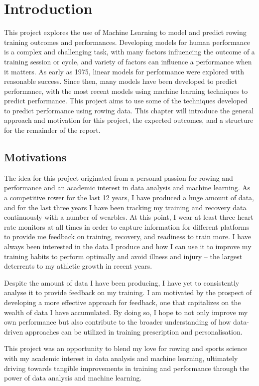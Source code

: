 \chapter{\label{ch:intro}Introduction}
This project explores the use of Machine Learning to model and predict rowing training outcomes and performances. Developing models for human performance is a complex and challenging task, with many factors influencing the outcome of a training session or cycle, and variety of factors can influence a performance when it matters. As early as 1975, linear models for performance were explored with reasonable success. Since then, many models have been developed to predict performance, with the most recent models using machine learning techniques to predict performance. This project aims to use some of the techniques developed to predict performance using rowing data. This chapter will introduce the general approach and motivation for this project, the expected outcomes, and a structure for the remainder of the report.

\section{Motivations}
The idea for this project originated from a personal passion for rowing and performance and an academic interest in data analysis and machine learning. As a competitive rower for the last 12 years, I have produced a huge amount of data, and for the last three years I have been tracking my training and recovery data continuously with a number of wearbles. At this point, I wear at least three heart rate monitors at all times in order to capture information for different platforms to provide me feedback on training, recovery, and readiness to train more. I have always been interested in the data I produce and how I can use it to improve my training habits to perform optimally and avoid illness and injury -- the largest deterrents to my athletic growth in recent years. 

Despite the amount of data I have been producing, I have yet to consistently analyse it to provide feedback on my training. I am motivated by the prospect of developing a more effective approach for feedback, one that capitalizes on the wealth of data I have accumulated. By doing so, I hope to not only improve my own performance but also contribute to the broader understanding of how data-driven approaches can be utilized in training prescription and personalisation.

This project was an opportunity to blend my love for rowing and sports science with my academic interest in data analysis and machine learning, ultimately driving towards tangible improvements in training and performance through the power of data analysis and machine learning.

